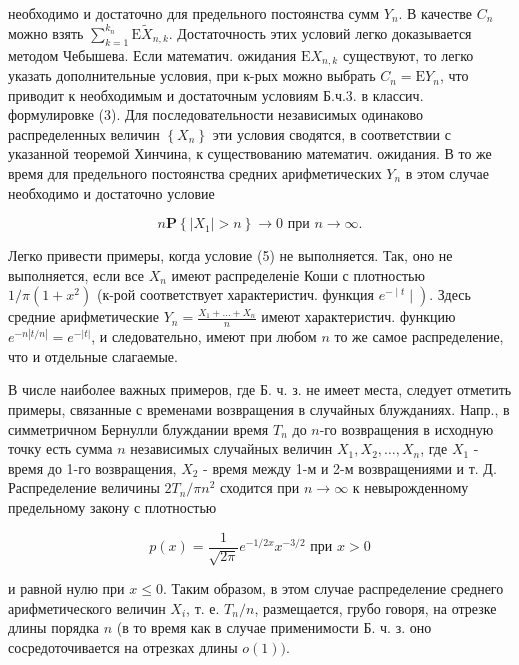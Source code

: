 \documentclass[10pt]{article}
\begin{document}
необходимо и достаточно для предельного постоянства сумм $Y_{n}$. В качестве $C_{n}$ можно взять $\sum_{k=1}^{k_{n}} \mathrm{E} \tilde{X}_{n, k}$. Достаточность этих условий легко доказывается методом Чебышева. Если математич. ожидания $\mathrm{E} X_{n, k}$ существуют, то легко указать дополнительные условия, при к-рых можно выбрать $C_{n}=\mathrm{E} Y_{n}$, что приводит к необходимым и достаточным условиям Б.ч.3. в классич. формулировке (3). Для последовательности независимых одинаково распределенных величин $\left\{X_{n}\right\}$ эти условия сводятся, в соответствии с указанной теоремой Хинчина, к существованию математич. ожидания. В то же время для предельного постоянства средних арифметических $Y_{n}$ в этом случае необходимо и достаточно условие



\[

n \mathbf{P}\left\{\left|X_{1}\right|>n\right\} \longrightarrow 0 \text { при } n \longrightarrow \infty .

\]



Легко привести примеры, когда условие (5) не выполняется. Так, оно не выполняется, если все $X_{n}$ имеют распределеніе Коши с плотностью $1 / \pi\left(1+x^{2}\right)$ (к-рой соответствует характеристич. функция $\left.e^{-\mid t} \mid\right)$. Здесь средние арифметические $Y_{n}=\frac{X_{1}+\ldots+X_{n}}{n}$ имеют характеристич. функцию $e^{-n|t / n|}=e^{-|t|}$, и следовательно, имеют при любом $n$ то же самое распределение, что и отдельные слагаемые.



В числе наиболее важных примеров, где Б. ч. з. не имеет места, следует отметить примеры, связанные с временами возвращения в случайных блужданиях. Напр., в симметричном Бернулли блуждании время $T_{n}$ до $n$-го возвращения в исходную точку есть сумма $n$ независимых случайных величин $X_{1}, X_{2}, \ldots, X_{n}$, где $X_{1}$ - время до 1-го возвращения, $X_{2}$ - время между 1-м и 2-м возвращениями и т. Д. Распределение величины $2 T_{n} / \pi n^{2}$ сходится при $n \rightarrow \infty$ к невырожденному предельному закону с плотностью



\[

p(x)=\frac{1}{\sqrt{2 \pi}} e^{-1 / 2 x} x^{-3 / 2} \text { при } x>0

\]



и равной нулю при $x \leqslant 0$. Таким образом, в этом случае распределение среднего арифметического величин $X_{i}$, т. е. $T_{n} / n$, размещается, грубо говоря, на отрезке длины порядка $n$ (в то время как в случае применимости Б. ч. з. оно сосредоточивается на отрезках длины $o(1))$.
\end{document}
